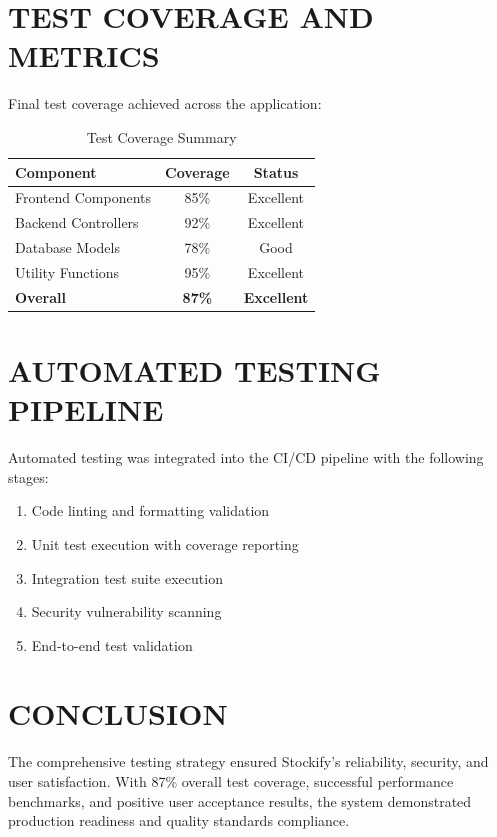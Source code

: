 \section{TEST COVERAGE AND METRICS}

Final test coverage achieved across the application:

\begin{table}[ht]
\centering
\begin{tabular}{|l|c|c|}
\hline
\textbf{Component} & \textbf{Coverage} & \textbf{Status} \\
\hline
Frontend Components & 85\% & Excellent \\
Backend Controllers & 92\% & Excellent \\
Database Models & 78\% & Good \\
Utility Functions & 95\% & Excellent \\
\hline
\textbf{Overall} & \textbf{87\%} & \textbf{Excellent} \\
\hline
\end{tabular}
\caption{Test Coverage Summary}
\end{table}

\section{AUTOMATED TESTING PIPELINE}

Automated testing was integrated into the CI/CD pipeline with the following stages:
\begin{enumerate}
\item Code linting and formatting validation
\item Unit test execution with coverage reporting
\item Integration test suite execution
\item Security vulnerability scanning
\item End-to-end test validation
\end{enumerate}

\section{CONCLUSION}

The comprehensive testing strategy ensured Stockify's reliability, security, and user satisfaction. With 87\% overall test coverage, successful performance benchmarks, and positive user acceptance results, the system demonstrated production readiness and quality standards compliance.